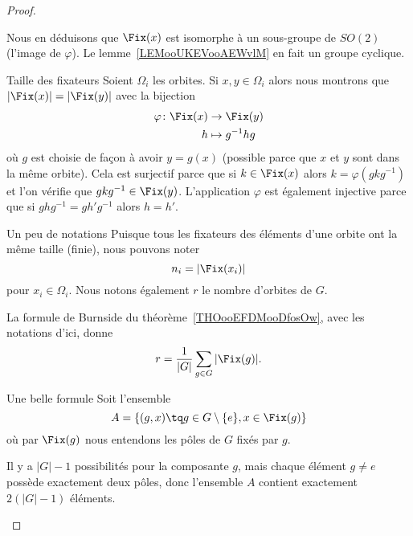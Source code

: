 \begin{proof}
\begin{subproof}
		Nous en déduisons que \( \Fix(x)\) est isomorphe à un sous-groupe de \( SO(2)\) (l'image de \( \varphi\)). Le lemme~\ref{LEMooUKEVooAEWvlM} en fait un groupe cyclique.

		\item[Taille des fixateurs]
		Soient \( \Omega_i\) les orbites. Si \( x,y\in \Omega_i\) alors nous montrons que \( | \Fix(x) |=| \Fix(y) |\) avec la bijection
		\begin{equation}
			\begin{aligned}
				\varphi\colon \Fix(x) & \to \Fix(y)       \\
				h                     & \mapsto g^{-1} hg
			\end{aligned}
		\end{equation}
		où \( g\) est choisie de façon à avoir \( y=g(x)\) (possible parce que \( x\) et \( y\) sont dans la même orbite). Cela est surjectif parce que si \( k\in\Fix(x)\) alors \( k=\varphi(gkg^{-1})\) et l'on vérifie que \( gkg^{-1}\in\Fix(y)\). L'application \( \varphi\) est également injective parce que si \( ghg^{-1}=gh'g^{-1}\) alors \( h=h'\).

		\item[Un peu de notations]
		Puisque tous les fixateurs des éléments d'une orbite ont la même taille (finie), nous pouvons noter
		\begin{equation}
			n_i=| \Fix(x_i) |
		\end{equation}
		pour \( x_i\in \Omega_i\). Nous notons également \( r\) le nombre d'orbites de \( G\).

		La formule de Burnside du théorème~\ref{THOooEFDMooDfosOw}, avec les notations d'ici, donne
		\begin{equation}
			r=\frac{1}{ | G | }\sum_{g\in G}| \Fix(g) |.
		\end{equation}

		\item[Une belle formule]
		Soit l'ensemble
		\begin{equation}
			A=\{ (g,x)\tq g\in G\setminus\{ e \}, x\in \Fix(g) \}
		\end{equation}
		où par \( \Fix(g)\) nous entendons les pôles de \( G\) fixés par \( g\).

		Il y a \( | G |-1\) possibilités pour la composante \( g\), mais chaque élément \( g\neq e\) possède exactement deux pôles, donc l'ensemble \( A\) contient exactement \( 2(| G |-1)\) éléments.


\end{subproof}
\end{proof}
